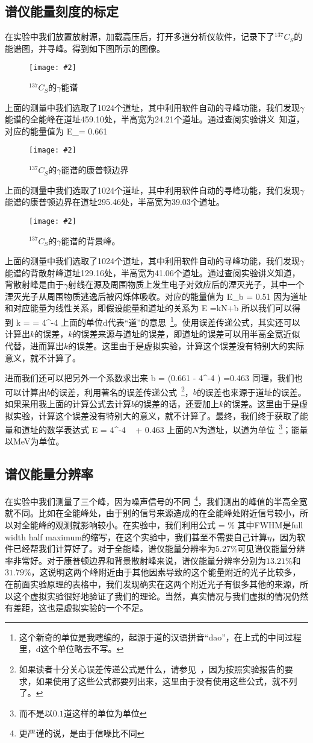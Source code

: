 \documentclass[11pt,a4paper]{ctexart}
\newcommand{\cpic}[2]{
\begin{center}
\texttt{[image: \#2]}
\end{center}
}
\newcommand{\cpicn}[3]
{
\begin{figure}[H]
\cpic{#1}{#2}
\caption{\color{red}#3\label{#2}}
\end{figure}
}
\begin{document}
\subsection{谱仪能量刻度的标定}
在实验中我们放置放射源，加载高压后，打开多道分析仪软件，记录下了$^{137}C_S$的能谱图，并寻峰。得到如下图所示的图像。
\cpicn{0.4}{gamma137Cs}{$^{137}C_S$的$\gamma$能谱}
上面的测量中我们选取了1024个道址，其中利用软件自动的寻峰功能，我们发现$\gamma$能谱的全能峰在道址459.10处，半高宽为24.21个道址。通过查阅实验讲义~\cite{lec}知道，对应的能量值为
\beq
E_\gamma = 0.661 
\eeq
\cpicn{0.4}{gamma_peak2}{$^{137}C_S$的$\gamma$能谱的康普顿边界}
上面的测量中我们选取了1024个道址，其中利用软件自动的寻峰功能，我们发现$\gamma$能谱的康普顿边界在道址295.46处，半高宽为39.03个道址。
\cpicn{0.4}{gamma_peak1}{$^{137}C_S$的$\gamma$能谱的背景峰。}
上面的测量中我们选取了1024个道址，其中利用软件自动的寻峰功能，我们发现$\gamma$能谱的背散射峰道址129.16处，半高宽为41.06个道址。通过查阅实验讲义知道，背散射峰是由于$\gamma$射线在源及周围物质上发生电子对效应后的湮灭光子，其中一个湮灭光子从周围物质逃逸后被闪烁体吸收。对应的能量值为
\beq
E_b = 0.51
\eeq
因为道址和对应能量为线性关系，即假设能量和道址的关系为
\beq
E =kN+b
\eeq
所以我们可以得到
\beq
k =  = 4^{-4}
\eeq
上面的单位d代表“道”的意思~\footnote{这个新奇的单位是我瞎编的，起源于道的汉语拼音“dao”，在上式的中间过程里，d这个单位略去不写。}。使用误差传递公式，其实还可以计算出$k$的误差，$k$的误差来源与道址的误差，即道址的误差可以用半高全宽近似代替，进而算出$k$的误差。这里由于是虚拟实验，计算这个误差没有特别大的实际意义，就不计算了。

进而我们还可以把另外一个系数求出来
\beq
b = \left(0.661 - 4^{-4} \right) =0.463
\eeq
同理，我们也可以计算出$b$的误差，利用著名的误差传递公式~\footnote{如果读者十分关心误差传递公式是什么，请参见~\cite{error}，因为按照实验报告的要求，如果使用了这些公式都要列出来，这里由于没有使用这些公式，就不列了。}，$b$的误差也来源于道址的误差。如果采用我上面的计算公式去计算$b$的误差的话，还要加上$k$的误差。这里由于是虚拟实验，计算这个误差没有特别大的意义，就不计算了。最终，我们终于获取了{\color{red}能量和道址的数学表达式}
\beq
E = 4^{-4} \,\,\, + 0.463
\eeq
上面的$N$为道址，以道为单位~\footnote{而不是以$0.1$道这样的单位为单位}；能量以MeV为单位。
\subsection{谱仪能量分辨率}
在实验中我们测量了三个峰，因为噪声信号的不同~\footnote{更严谨的说，是由于信噪比不同}，我们测出的峰值的半高全宽就不同。比如在全能峰处，由于别的信号来源造成的在全能峰处附近信号较小，所以对全能峰的观测就影响较小。在实验中，我们利用公式
\beq
\eta = \%
\eeq
其中FWHM是full width half maximum的缩写，在这个实验中，我们甚至不需要自己计算$\eta$，因为软件已经帮我们计算好了。对于全能峰，谱仪能量分辨率为$5.27\%$可见谱仪能量分辨率非常好。对于康普顿边界和背景散射峰来说，谱仪能量分辨率分别为$13.21\%$和$31.79\%$，这说明这两个峰附近由于其他因素导致的这个能量附近的光子比较多，在前面实验原理的表格中，我们发现确实在这两个附近光子有很多其他的来源，所以这个虚拟实验很好地验证了我们的理论。当然，真实情况与我们虚拟的情况仍然有差距，这也是虚拟实验的一个不足。
\end{document}
